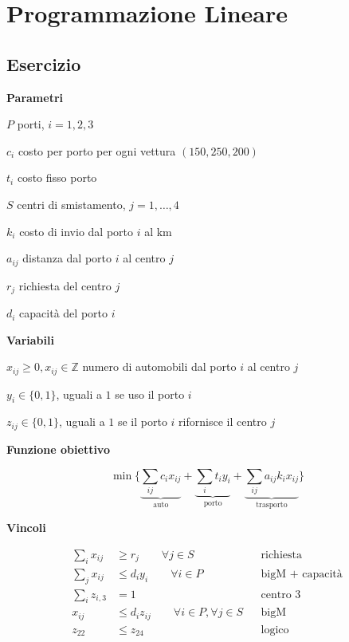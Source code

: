 \documentclass[10pt,a4paper,twoside,openright]{book}
\newcounter{es}
\newcommand{\Es}{
	\stepcounter{es}
	\section{Esercizio \arabic{es}}
	}
\numberwithin{es}{chapter}
\newcommand{\Par}{\textbf{Parametri}}
\newcommand{\Var}{\textbf{Variabili}}
\newcommand{\Fob}{\textbf{Funzione obiettivo}}
\newcommand{\Vin}{\textbf{Vincoli}}
\begin{document}

\mainmatter
\pagestyle{fancy} %


\chapter{Programmazione Lineare}

\Es

\Par

$P$ porti, $i=1,2,3$

$c_{i}$ costo per porto per ogni vettura $( 150,250,200)$

$t_{i}$ costo fisso porto

$S$ centri di smistamento, $j=1,\dotsc ,4$

$k_{i}$ costo di invio dal porto $i$ al km

$a_{ij}$ distanza dal porto $i$ al centro $j$

$r_{j}$ richiesta del centro $j$

$d_{i}$ capacità del porto $i$

\Var

$x_{ij} \geq 0,x_{ij} \in \mathbb{Z}$ numero di automobili dal porto $i$ al centro $j$

$y_{i} \in \{0,1\}$, uguali a $1$ se uso il porto $i$

$z_{ij} \in \{0,1\}$, uguali a $1$ se il porto $i$ rifornisce il centro $j$

\Fob

\begin{equation*}
	\min\bigg\{\underbrace{\sum _{ij} c_{i} x_{ij}}_{\text{auto}} +\underbrace{\sum _{i} t_{i} y_{i}}_{\text{porto}} +\underbrace{\sum _{ij} a_{ij} k_{i} x_{ij}}_{\text{trasporto}}\bigg\}
\end{equation*}

\Vin

\begin{align*}
	\sum _{i} x_{ij} &\geq r_{j} \qquad\forall j\in S && \text{richiesta}\\
	\sum _{j} x_{ij} &\leq d_{i} y_{i} \qquad\forall i\in P && \text{bigM + capacità}\\
	\sum _{i} z_{i,3} &=1 && \text{centro 3}\\
	x_{ij} &\leq d_{i} z_{ij} \qquad\forall i\in P,\forall j\in S && \text{bigM}\\
	z_{22} &\leq z_{24} && \text{logico}\\
\end{align*}
\end{document}
